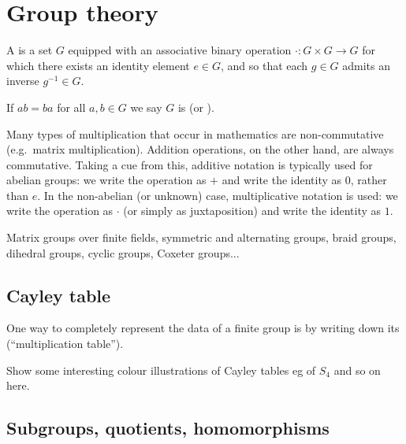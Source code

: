 \section{Group theory}

\begin{definition} %
A  is a set $G$ equipped with an associative binary operation $\cdot : G \times G \to G$ for which there exists an identity element $e \in G$, and so that each $g \in G$ admits an inverse $g^{-1} \in G$.
\end{definition}

If $ab=ba$ for all $a,b \in G$ we say $G$ is  (or ).

\begin{remark}[notation]
Many types of multiplication that occur in mathematics are non-commutative (e.g.\ matrix multiplication). Addition operations, on the other hand, are always commutative. Taking a cue from this, additive notation is typically used for abelian groups: we write the operation as $+$ and write the identity as $0$, rather than $e$. In the non-abelian (or unknown) case, multiplicative notation is used: we write the operation as $\cdot$ (or simply as juxtaposition) and write the identity as $1$.
\end{remark}

\begin{example}
Matrix groups over finite fields, symmetric and alternating groups, braid groups, dihedral groups, cyclic groups, Coxeter groups...
\end{example}

\subsection{Cayley table}

One way to completely represent the data of a finite group is by writing down its  (``multiplication table'').

\begin{example}
Show some interesting colour illustrations of Cayley tables eg of $S_4$ and so on here.
\end{example}

\subsection{Subgroups, quotients, homomorphisms}

